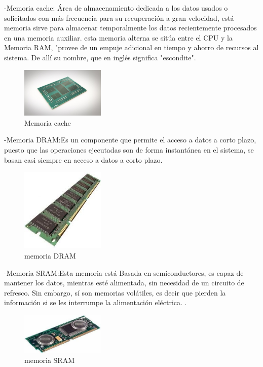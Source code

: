 \documentclass{article}
\begin{document}
-Memoria cache: Área de almacenamiento dedicada a los datos usados o solicitados con más frecuencia para su recuperación a gran velocidad, está memoria sirve para almacenar temporalmente los datos recientemente procesados en una memoria auxiliar. esta memoria alterna se sitúa entre el CPU y la Memoria RAM, \cite{cache} "provee de un empuje adicional en tiempo y ahorro de recursos al sistema. De allí su nombre, que en inglés significa "escondite".
\newline

\begin{figure}[h]
\includegraphics[width=4cm]{Cache.jpg}
\centering
\caption{Memoria cache}
\end{figure}
\newpage
-Memoria DRAM:Es un componente que permite el acceso a datos a corto plazo, puesto que las operaciones ejecutadas son de forma instantánea en el sistema, se basan casi siempre en acceso a datos a corto plazo.  \newline
\begin{figure}[h]
\includegraphics[width=4cm]{Dinamica.jpeg}
\centering
\caption{memoria DRAM}
\end{figure} 


-Memoria SRAM:Esta memoria está Basada en semiconductores, es capaz de mantener los datos, mientras esté alimentada, sin necesidad de un circuito de refresco. Sin embargo, sí son memorias volátiles, es decir que pierden la información si se les interrumpe la alimentación eléctrica. . \newline

\begin{figure}[h]
\includegraphics[width=4cm]{Estatica.jpg}
\centering
\caption{memoria SRAM}
\end{figure}
\end{document}
